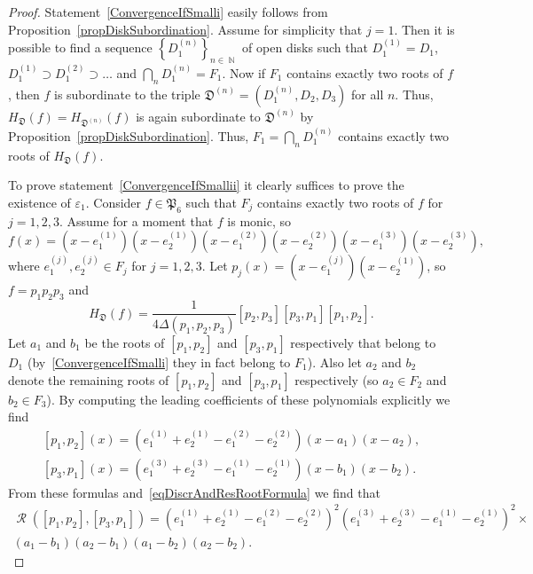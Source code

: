 \documentclass{amsart}
\numberwithin{equation}{section}
\theoremstyle{definition}
\theoremstyle{remark}
\DeclareMathOperator{\NN}{\mathbb N}
\DeclareMathOperator{\Res}{\mathcal R}
\begin{document}
	\begin{proof}
		Statement~\ref{ConvergenceIfSmalli} easily follows from Proposition~\ref{propDiskSubordination}. Assume for simplicity that $j = 1$. Then it is possible to find a sequence $\left\{D_1^{(n)}\right\}_{n \in \NN}$ of open disks such that $D_1^{(1)} = D_1$, $D_1^{(1)} \supset D_1^{(2)} \supset \dots$ and $\bigcap_n D_1^{(n)} = F_1$. Now if $F_1$ contains exactly two roots of $f$, then $f$ is subordinate to the triple $\mathfrak D^{(n)} = (D_1^{(n)}, D_2, D_3)$ for all $n$. Thus, $H_{\mathfrak D}(f) = H_{\mathfrak D^{(n)}}(f)$ is again subordinate to $\mathfrak D^{(n)}$ by Proposition~\ref{propDiskSubordination}. Thus, $F_1 = \bigcap_n D_1^{(n)}$ contains exactly two roots of $H_{\mathfrak D}(f)$.
		
		To prove statement~\ref{ConvergenceIfSmallii} it clearly suffices to prove the existence of $\varepsilon_1$. Consider $f \in \mathfrak P_6$ such that $F_j$ contains exactly two roots of $f$ for $j = 1,2,3$. Assume for a moment that $f$ is monic, so 
		\[
		f(x) = \left(x - e_1^{(1)}\right)\left(x - e_2^{(1)}\right)\left(x - e_1^{(2)}\right)\left(x - e_2^{(2)}\right)\left(x - e_1^{(3)}\right)\left(x - e_2^{(3)}\right),
		\]
		where $e_1^{(j)}, e_2^{(j)} \in F_j$ for $j = 1,2,3$. Let $p_j(x) = \left(x - e_1^{(j)}\right)\left(x - e_2^{(1)}\right)$, so $f = p_1p_2p_3$ and 
		\[
		H_{\mathfrak D}(f) = \frac{1}{4\Delta(p_1,p_2,p_3)}[p_2,p_3][p_3,p_1][p_1,p_2].
		\]
		Let $a_1$ and $b_1$ be the roots of $[p_1,p_2]$ and $[p_3, p_1]$ respectively that belong to $D_1$ (by~\ref{ConvergenceIfSmalli} they in fact belong to $F_1$). Also let $a_2$ and $b_2$ denote the remaining roots of $[p_1,p_2]$ and $[p_3,p_1]$ respectively (so $a_2 \in F_2$ and $b_2 \in F_3$). By computing the leading coefficients of these polynomials explicitly we find
		\[
		\begin{split}
			[p_1,p_2](x) = \left(e_1^{(1)} + e_2^{(1)} - e_1^{(2)} - e_2^{(2)}\right)(x - a_1)(x - a_2),\\
			[p_3,p_1](x) = \left(e_1^{(3)} + e_2^{(3)} - e_1^{(1)} - e_2^{(1)}\right)(x - b_1)(x - b_2).
		\end{split}
		\]
		From these formulas and~\eqref{eqDiscrAndResRootFormula} we find that 
		\begin{multline*}
			\Res([p_1,p_2], [p_3,p_1]) = \left(e_1^{(1)} + e_2^{(1)} - e_1^{(2)} - e_2^{(2)}\right)^2\left(e_1^{(3)} + e_2^{(3)} - e_1^{(1)} - e_2^{(1)}\right)^2 \times \\
			(a_1 - b_1)(a_2 - b_1)(a_1 - b_2)(a_2 - b_2).
		\end{multline*}

\end{proof}
\end{document}
